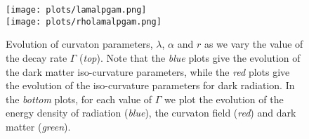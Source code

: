\documentclass[11pt]{article}
\begin{document}
\begin{figure}
\centering
\texttt{[image: plots/lamalpgam.png]} \\
\texttt{[image: plots/rholamalpgam.png]} 
\caption{Evolution of curvaton parameters, $\lambda$, $\alpha$ and $r$ as we vary the value of the decay rate $\Gamma$ (\textit{top}). Note that the \textit{blue} plots give the evolution of the dark matter iso-curvature parameters, while the \textit{red} plots give the evolution of the iso-curvature parameters for dark radiation. In the \textit{bottom} plots, for each value of $\Gamma$ we plot the evolution of the energy density of radiation (\textit{blue}), the curvaton field (\textit{red}) and dark matter (\textit{green}).}
\label{fig:lambda}
\end{figure}
\end{document}
